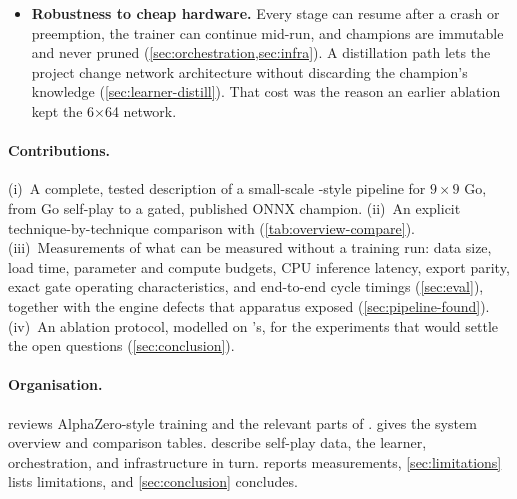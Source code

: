 \begin{itemize}
        target; an inverted value sign that made more search strictly weaker; and a search
        that never saw a game end. Three in the measurement apparatus, which is why the
        others survived: correlated per-game seeds, a strength baseline that silently
        enhanced both players, and matches that stopped on the statistic under test. On the project's own
        reproducible baseline, the side searching three times harder went from 7 wins in
        200 games to 136, a sign flip from $-576$ to $+131$ Elo
        (\cref{sec:pipeline-found}). This is the strongest argument in this report
        for building the measurement apparatus before spending money on compute.
  \item \textbf{Robustness to cheap hardware.} Every stage can resume after a crash or
        preemption, the trainer can continue mid-run, and champions are immutable and
        never pruned (\cref{sec:orchestration,sec:infra}). A distillation path lets the
        project change network architecture without discarding the champion's knowledge
        (\cref{sec:learner-distill}). That cost was the reason an earlier ablation kept the
        6$\times$64 network.
\end{itemize}

\paragraph{Contributions.}
(i)~A complete, tested description of a small-scale \katago{}-style pipeline for
$9\times9$ Go, from Go self-play to a gated, published ONNX champion. (ii)~An explicit
technique-by-technique comparison with \citet{wu2019accelerating}
(\cref{tab:overview-compare}). (iii)~Measurements of what can be measured without a
training run: data size, load time, parameter and compute budgets, CPU inference latency,
export parity, exact gate operating characteristics, and end-to-end cycle timings
(\cref{sec:eval}), together with the engine defects that apparatus exposed
(\cref{sec:pipeline-found}).
(iv)~An ablation protocol, modelled on \katago{}'s, for the experiments that would settle
the open questions (\cref{sec:conclusion}).

\paragraph{Organisation.}
 reviews AlphaZero-style training and the relevant parts of
\katago{}.  gives the system overview and comparison tables.
 describe self-play data, the
learner, orchestration, and infrastructure in turn.  reports measurements,
\cref{sec:limitations} lists limitations, and \cref{sec:conclusion} concludes.
